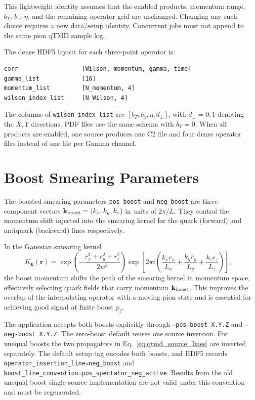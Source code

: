 \documentclass[11pt,a4paper]{article}
\begin{document}
This lightweight identity assumes that the enabled products, momentum range,
\(b_T\), \(b_z\), \(\eta\), and the remaining operator grid are unchanged.
Changing any such choice requires a new data/setup identity.  Concurrent jobs
must not append to the same pion qTMD sample log.

The dense HDF5 layout for each three-point operator is:
\begin{verbatim}
corr                  [Wilson, momentum, gamma, time]
gamma_list            [16]
momentum_list         [N_momentum, 4]
wilson_index_list     [N_Wilson, 4]
\end{verbatim}

The columns of \texttt{wilson\_index\_list} are
\([b_T,b_z,\eta,d_\perp]\), with \(d_\perp=0,1\) denoting the \(X,Y\)
directions.  PDF files use the same schema with \(b_T=0\).  When all products
are enabled, one source produces one C2 file and four dense operator files
instead of one file per Gamma channel.

\section{Boost Smearing Parameters}
\label{sec:boost}

The boosted smearing parameters \texttt{pos\_boost} and \texttt{neg\_boost} are
three-component vectors $\mathbf{k}_{\rm boost} = (k_x, k_y, k_z)$ in units of
$2\pi/L$.  They control the momentum shift injected into the smearing kernel
for the quark (forward) and antiquark (backward) lines respectively.

In the Gaussian smearing kernel
\begin{equation}
  K_{\mathbf{k}}(\mathbf{r})
  =
  \exp\!\left(-\frac{r_x^2+r_y^2+r_z^2}{2w^2}\right)
  \exp\!\left[
    2\pi i
    \left(
      \frac{k_x r_x}{L_x}
      + \frac{k_y r_y}{L_y}
      + \frac{k_z r_z}{L_z}
    \right)
  \right],
\end{equation}
the boost momentum shifts the peak of the smearing kernel in momentum space,
effectively selecting quark fields that carry momentum $\mathbf{k}_{\rm boost}$.
This improves the overlap of the interpolating operator with a moving pion state
and is essential for achieving good signal at finite boost $p_f$.

The application accepts both boosts explicitly through
\texttt{--pos-boost X.Y.Z} and \texttt{--neg-boost X.Y.Z}.  The zero-boost
default reuses one source inversion.  For unequal boosts the two propagators in
Eq.~\eqref{eq:qtmd_source_lines} are inverted separately.  The default setup
tag encodes both boosts, and HDF5 records
\texttt{operator\_insertion\_line=neg\_boost} and
\texttt{boost\_line\_convention=pos\_spectator\_neg\_active}.  Results from the
old unequal-boost single-source implementation are not valid under this
convention and must be regenerated.
\end{document}
